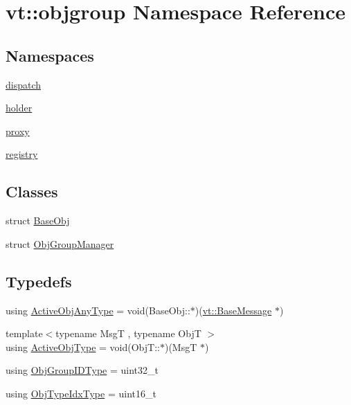 \hypertarget{namespacevt_1_1objgroup}{}\section{vt\+:\+:objgroup Namespace Reference}
\label{namespacevt_1_1objgroup}
\subsection*{Namespaces}
\begin{DoxyCompactItemize}
\item 
 \hyperlink{namespacevt_1_1objgroup_1_1dispatch}{dispatch}
\item 
 \hyperlink{namespacevt_1_1objgroup_1_1holder}{holder}
\item 
 \hyperlink{namespacevt_1_1objgroup_1_1proxy}{proxy}
\item 
 \hyperlink{namespacevt_1_1objgroup_1_1registry}{registry}
\end{DoxyCompactItemize}
\subsection*{Classes}
\begin{DoxyCompactItemize}
\item 
struct \hyperlink{structvt_1_1objgroup_1_1_base_obj}{Base\+Obj}
\item 
struct \hyperlink{structvt_1_1objgroup_1_1_obj_group_manager}{Obj\+Group\+Manager}
\end{DoxyCompactItemize}
\subsection*{Typedefs}
\begin{DoxyCompactItemize}
\item 
using \hyperlink{namespacevt_1_1objgroup_a25bec5d3c8e8bb02b62280eec62b8ac7}{Active\+Obj\+Any\+Type} = void(Base\+Obj\+::$\ast$)(\hyperlink{namespacevt_ac34f95a5e2b8109b55bfba52b074443d}{vt\+::\+Base\+Message} $\ast$)
\item 
{\footnotesize template$<$typename MsgT , typename ObjT $>$ }\\using \hyperlink{namespacevt_1_1objgroup_a979bd9dc714fdacafc4b83f98271bc23}{Active\+Obj\+Type} = void(Obj\+T\+::$\ast$)(MsgT $\ast$)
\item 
using \hyperlink{namespacevt_1_1objgroup_a54a50ff6833bf618e5bedb9a3b6d0e07}{Obj\+Group\+I\+D\+Type} = uint32\+\_\+t
\item 
using \hyperlink{namespacevt_1_1objgroup_a378e4b966221779c74f3a2f921eb2421}{Obj\+Type\+Idx\+Type} = uint16\+\_\+t
\end{DoxyCompactItemize}
